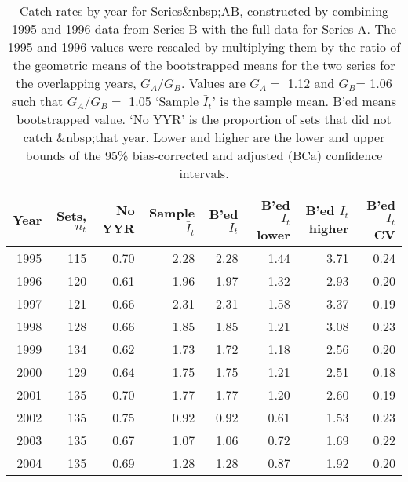
\begin{table}[tp]
\centering
\caption{Catch rates by year for Series&nbsp;AB, constructed by combining 
     1995 and 1996 data
     from Series B with the full data for Series A. The 1995 and 1996 values
     were rescaled by multiplying them by the ratio of the geometric means
     of the bootstrapped means for the two series for the overlapping 
     years, $G_A / G_B$. Values are
     $G_A=$ 1.12  and $G_B$= 1.06 such that $G_A / G_B=$ 1.05 `Sample $\bar{I}_t$' is the sample mean. B'ed means bootstrapped 
     value. `No YYR' is the proportion of sets that did not catch \spName
     &nbsp;that year. Lower and higher are the 
     lower and upper bounds of the 95\% bias-corrected and adjusted (BCa)
     confidence intervals.} 
\label{tab:serAB}
\begin{tabular}{rrrrrrrr}
  \hline
Year & Sets, $n_t$ & No YYR & Sample $\bar{I}_t$ & B'ed $I_t$ & B'ed $I_t$ lower & B'ed $I_t$ higher & B'ed $I_t$ CV \\ 
  \hline
1995 & 115 & 0.70 & 2.28 & 2.28 & 1.44 & 3.71 & 0.24 \\ 
  1996 & 120 & 0.61 & 1.96 & 1.97 & 1.32 & 2.93 & 0.20 \\ 
  1997 & 121 & 0.66 & 2.31 & 2.31 & 1.58 & 3.37 & 0.19 \\ 
  1998 & 128 & 0.66 & 1.85 & 1.85 & 1.21 & 3.08 & 0.23 \\ 
  1999 & 134 & 0.62 & 1.73 & 1.72 & 1.18 & 2.56 & 0.20 \\ 
  2000 & 129 & 0.64 & 1.75 & 1.75 & 1.21 & 2.51 & 0.18 \\ 
  2001 & 135 & 0.70 & 1.77 & 1.77 & 1.20 & 2.60 & 0.19 \\ 
  2002 & 135 & 0.75 & 0.92 & 0.92 & 0.61 & 1.53 & 0.23 \\ 
  2003 & 135 & 0.67 & 1.07 & 1.06 & 0.72 & 1.69 & 0.22 \\ 
  2004 & 135 & 0.69 & 1.28 & 1.28 & 0.87 & 1.92 & 0.20 \\ 

\end{tabular}
\end{table}
